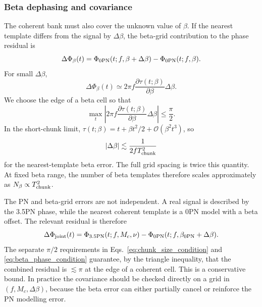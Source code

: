 \documentclass[aps,prd,amsmath,floats,floatfix, twocolumn,
superscriptaddress,nofootinbib,showpacs]{revtex4-2}
\begin{document}
\subsubsection{Beta dephasing and covariance}
\label{sec:beta_grid}
The coherent bank must also cover the unknown value of $\beta$.  If the nearest
template differs from the signal by $\Delta\beta$, the beta-grid contribution
to the phase residual is
\begin{equation}
\Delta\Phi_\beta(t)
=
\Phi_{\rm 0PN}(t;f,\beta+\Delta\beta)
-
\Phi_{\rm 0PN}(t;f,\beta).
\end{equation}
For small $\Delta\beta$,
\begin{equation}
\Delta\Phi_\beta(t)
\simeq
2\pi f
\frac{\partial \tau(t;\beta)}{\partial\beta}
\Delta\beta.
\end{equation}
We choose the edge of a beta cell so that
\begin{equation}
\max_t
\left|
2\pi f
\frac{\partial \tau(t;\beta)}{\partial\beta}
\Delta\beta
\right|
\leq \frac{\pi}{2}.
\label{eq:beta_phase_condition}
\end{equation}
In the short-chunk limit,
$\tau(t;\beta)=t+\beta t^2/2+\mathcal{O}(\beta^2t^3)$, so
\begin{equation}
|\Delta\beta|
\lesssim
\frac{1}{2fT_{\rm chunk}^2}
\end{equation}
for the nearest-template beta error.  The full grid spacing is twice this
quantity.  At fixed beta range, the number of beta templates therefore scales
approximately as $N_\beta\propto T_{\rm chunk}^2$.

The PN and beta-grid errors are not independent.  A real signal is described by
the 3.5PN phase, while the nearest coherent template is a 0PN model with a beta
offset.  The relevant residual is therefore
\begin{equation}
\Delta\Phi_{\rm joint}(t)
=
\Phi_{\rm 3.5PN}(t;f,M_c,\nu)
-
\Phi_{\rm 0PN}(t;f,\beta_{\rm 0PN}+\Delta\beta).
\end{equation}
The separate $\pi/2$ requirements in
Eqs.~\eqref{eq:chunk_size_condition} and \eqref{eq:beta_phase_condition}
guarantee, by the triangle inequality, that the combined residual is
$\lesssim\pi$ at the edge of a coherent cell.  This is a conservative bound.
In practice the covariance should be checked directly on a grid in
$(f,M_c,\Delta\beta)$, because the beta error can either partially cancel or
reinforce the PN modelling error.
\end{document}
